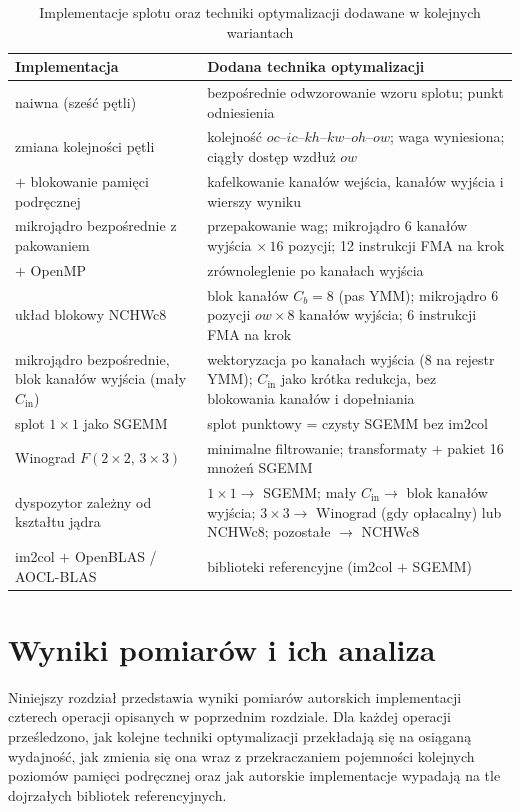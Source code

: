 \documentclass[a4paper,12pt]{book} %
\begin{document}
\begin{table}[t!]
\centering
\caption{Implementacje splotu oraz techniki optymalizacji dodawane w kolejnych wariantach}
\label{tab:conv-impl}
\begin{tabular}{p{} p{}}
\hline
Implementacja & Dodana technika optymalizacji \\
\hline
naiwna (sześć pętli) & bezpośrednie odwzorowanie wzoru splotu; punkt odniesienia \\
zmiana kolejności pętli & kolejność $oc$--$ic$--$kh$--$kw$--$oh$--$ow$; waga wyniesiona; ciągły dostęp wzdłuż $ow$ \\
$+$ blokowanie pamięci podręcznej & kafelkowanie kanałów wejścia, kanałów wyjścia i wierszy wyniku \\
mikrojądro bezpośrednie z pakowaniem & przepakowanie wag; mikrojądro $6$ kanałów wyjścia $\times\, 16$ pozycji; 12 instrukcji FMA na krok \\
$+$ OpenMP & zrównoleglenie po kanałach wyjścia \\
układ blokowy NCHWc8 & blok kanałów $C_b = 8$ (pas YMM); mikrojądro $6$ pozycji $ow \times 8$ kanałów wyjścia; 6 instrukcji FMA na krok \\
mikrojądro bezpośrednie, blok kanałów wyjścia (mały $C_{\mathrm{in}}$) & wektoryzacja po kanałach wyjścia (8 na rejestr YMM); $C_{\mathrm{in}}$ jako krótka redukcja, bez blokowania kanałów i dopełniania \\
splot $1 \times 1$ jako SGEMM & splot punktowy = czysty SGEMM bez im2col \\
Winograd $F(2 \times 2,\, 3 \times 3)$ & minimalne filtrowanie; transformaty $+$ pakiet 16 mnożeń SGEMM \\
dyspozytor zależny od kształtu jądra & $1 \times 1 \to$ SGEMM; mały $C_{\mathrm{in}} \to$ blok kanałów wyjścia; $3 \times 3 \to$ Winograd (gdy opłacalny) lub NCHWc8; pozostałe $\to$ NCHWc8 \\
im2col $+$ OpenBLAS / AOCL-BLAS & biblioteki referencyjne (im2col $+$ SGEMM) \\
\hline
\end{tabular}
\end{table}

\chapter{Wyniki pomiarów i ich analiza}
\label{chap:wyniki}

Niniejszy rozdział przedstawia wyniki pomiarów autorskich implementacji czterech operacji opisanych w poprzednim rozdziale. Dla każdej operacji prześledzono, jak kolejne techniki optymalizacji przekładają się na osiąganą wydajność, jak zmienia się ona wraz z przekraczaniem pojemności kolejnych poziomów pamięci podręcznej oraz jak autorskie implementacje wypadają na tle dojrzałych bibliotek referencyjnych.
\end{document}
